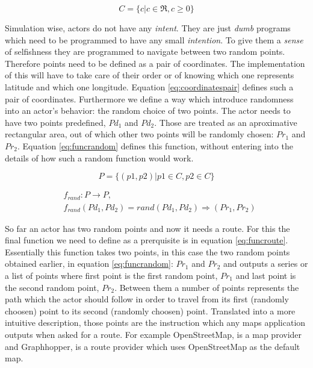 \documentclass[a4paper,12pt,twoside]{book}
\begin{document}
\begin{equation}
\label{eq:coordinates}
    C = \{ c | c \in \Re, c \geq 0 \}
\end{equation}

Simulation wise, actors do not have any \textit{intent}. They are just \textit{dumb} programs which need to be programmed to have any small \textit{intention}. To give them a \textit{sense} of selfishness they are programmed to navigate between two random points. Therefore points need to be defined as a pair of coordinates. The implementation of this will have to take care of their order or of knowing which one represents latitude and which one longitude. Equation \ref{eq:coordinatespair} defines such a pair of coordinates. Furthermore we define a way which introduce randomness into an actor's behavior: the random choice of two points. The actor needs to have two points predefined, $Pd_1$ and $Pd_2$. Those are treated as an aproximative rectangular area, out of which other two points will be randomly chosen: $Pr_1$ and $Pr_2$. Equation \ref{eq:funcrandom} defines this function, without entering into the details of how such a random function would work.

\begin{equation}
\label{eq:coordinatespair}
    P = \{ (p1, p2) | p1 \in C, p2 \in C \}
\end{equation}

\begin{equation}
\label{eq:funcrandom}
\begin{split}
    & f_{rand}: P \rightarrow P, \\
    & f_{rand}(Pd_1, Pd_2) = rand (Pd_1, Pd_2) \Rightarrow (Pr_1, Pr_2)
\end{split}
\end{equation}

So far an actor has two random points and now it needs a route. For this the final function we need to define as a prerquisite is in equation \ref{eq:funcroute}. Essentially this function takes two points, in this case the two random points obtained earlier, in equation \ref{eq:funcrandom}: $Pr_1$ and $Pr_2$ and outputs a series or a list of points where first point is the first random point, $Pr_1$ and last point is the second random point, $Pr_2$. Between them a number of points represents the path which the actor should follow in order to travel from its first (randomly choosen) point to its second (randomly choosen) point. Translated into a more intuitive description, those points are the instruction which any maps application outputs when asked for a route. For example OpenStreetMap, \cite{openstreetmap} is a map provider and Graphhopper, \cite{graphhopper} is a route provider which uses OpenStreetMap as the default map.
\end{document}
